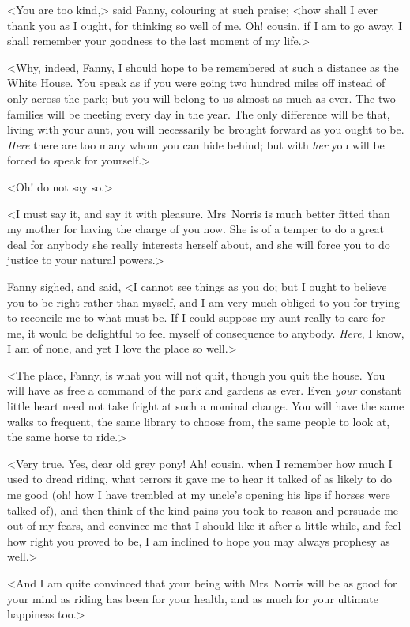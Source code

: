 <You are too kind,> said Fanny, colouring at such praise; <how shall I ever thank you as I ought, for thinking so well of me. Oh! cousin, if I am to go away, I shall remember your goodness to the last moment of my life.>

<Why, indeed, Fanny, I should hope to be remembered at such a distance as the White House. You speak as if you were going two hundred miles off instead of only across the park; but you will belong to us almost as much as ever. The two families will be meeting every day in the year. The only difference will be that, living with your aunt, you will necessarily be brought forward as you ought to be. \textit{Here}  there are too many whom you can hide behind; but with \textit{her}  you will be forced to speak for yourself.>

<Oh! do not say so.>

<I must say it, and say it with pleasure. Mrs~Norris is much better fitted than my mother for having the charge of you now. She is of a temper to do a great deal for anybody she really interests herself about, and she will force you to do justice to your natural powers.>

Fanny sighed, and said, <I cannot see things as you do; but I ought to believe you to be right rather than myself, and I am very much obliged to you for trying to reconcile me to what must be. If I could suppose my aunt really to care for me, it would be delightful to feel myself of consequence to anybody. \textit{Here}, I know, I am of none, and yet I love the place so well.>

<The place, Fanny, is what you will not quit, though you quit the house. You will have as free a command of the park and gardens as ever. Even \textit{your}  constant little heart need not take fright at such a nominal change. You will have the same walks to frequent, the same library to choose from, the same people to look at, the same horse to ride.>

<Very true. Yes, dear old grey pony! Ah! cousin, when I remember how much I used to dread riding, what terrors it gave me to hear it talked of as likely to do me good (oh! how I have trembled at my uncle's opening his lips if horses were talked of), and then think of the kind pains you took to reason and persuade me out of my fears, and convince me that I should like it after a little while, and feel how right you proved to be, I am inclined to hope you may always prophesy as well.>

<And I am quite convinced that your being with Mrs~Norris will be as good for your mind as riding has been for your health, and as much for your ultimate happiness too.>

